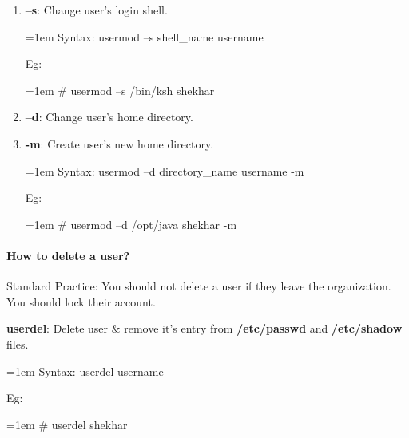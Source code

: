 \begin{flushleft}
\begin{enumerate}[label=(\alph*)]
		\item \textbf{–s}: Change user's login shell.
		\bigskip
		\begin{tcolorbox}[breakable,notitle,boxrule=0pt,colback=pink,colframe=pink]
			\color{black}
			\font=1em
			Syntax: usermod –s shell\_name username
			\font=4pt
		\end{tcolorbox}
		Eg:
		\bigskip
		\begin{tcolorbox}[breakable,notitle,boxrule=-0pt,colback=black,colframe=black]
			\color{green}
			\font=1em
			\# usermod –s /bin/ksh shekhar
			\font=4pt
		\end{tcolorbox}
		
		
		\item \textbf{–d}: Change user's home directory.
		\item \textbf{-m}: Create user's new home directory.
		\bigskip
		\begin{tcolorbox}[breakable,notitle,boxrule=0pt,colback=pink,colframe=pink]
			\color{black}
			\font=1em
			Syntax: usermod –d directory\_name username -m
			\font=4pt
		\end{tcolorbox}
		Eg:
		\bigskip
		\begin{tcolorbox}[breakable,notitle,boxrule=-0pt,colback=black,colframe=black]
			\color{green}
			\font=1em
			\# usermod –d /opt/java shekhar -m
			\font=4pt
		\end{tcolorbox}
	\end{enumerate}
	
	\bigskip
	\bigskip
	
	\newpage
	
	\paragraph{How to delete a user?}
	
	\bigskip
	\begin{tcolorbox}[breakable,notitle,boxrule=-0pt,colback=red,colframe=red]
		\color{white}
		Standard Practice: You should not delete a user if they leave	 the organization. You
		should lock their account.
	\end{tcolorbox}
	
	
	
	\textbf{userdel}: Delete user \& remove it's entry from \textbf{/etc/passwd} and \textbf{/etc/shadow} files.
	\begin{tcolorbox}[breakable,notitle,boxrule=0pt,colback=pink,colframe=pink]
		\color{black}
		\font=1em
		Syntax: userdel username
		\font=4pt
	\end{tcolorbox}
	Eg:
	\begin{tcolorbox}[breakable,notitle,boxrule=-0pt,colback=black,colframe=black]
		\color{green}
		\font=1em
		\# userdel shekhar
		\font=4pt
	\end{tcolorbox}


\end{flushleft}
